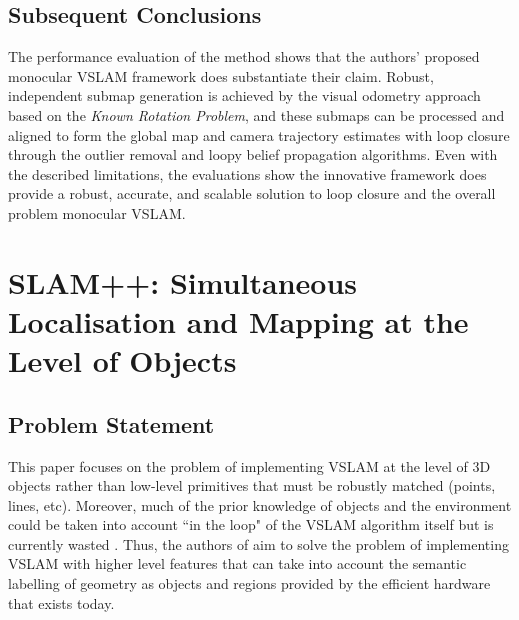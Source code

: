 \documentclass[10pt,twocolumn,letterpaper]{article}
\begin{document}
\subsection{Subsequent Conclusions}
The performance evaluation of the method shows that the authors' proposed monocular VSLAM framework does
 substantiate their claim. Robust, independent submap generation is achieved by the visual odometry approach 
based on the \textit{Known Rotation Problem}, and these submaps can be processed and aligned to form the 
global map and camera trajectory estimates with loop closure through the outlier removal and loopy belief 
propagation algorithms. Even with the described limitations, the evaluations show the innovative framework does 
provide a robust, accurate, and scalable solution to loop closure and the overall problem monocular VSLAM.

\section {SLAM++: Simultaneous Localisation and Mapping at the Level of Objects}
\subsection{Problem Statement}
This paper focuses on the problem of implementing VSLAM at the level of 3D objects rather than low-level 
primitives that must be robustly matched (\eg points, lines, etc). Moreover, much of the prior knowledge of
 objects and the environment could be taken into account ``in the loop" of the VSLAM algorithm itself but is 
 currently wasted \cite{Salas-Moreno_2013_CVPR}. Thus, the authors of \cite{Salas-Moreno_2013_CVPR} 
 aim to solve the problem of implementing VSLAM with higher level features that can take into account the semantic labelling of geometry as objects and regions provided by the efficient hardware that exists today.

\end{document}
